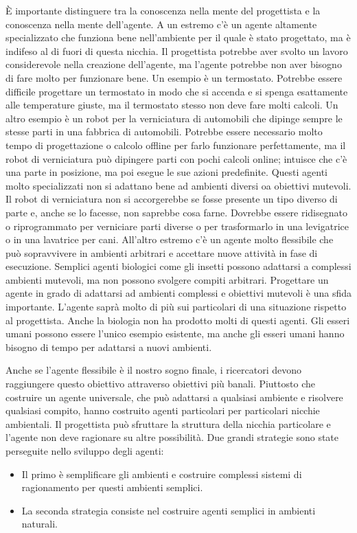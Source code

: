 \documentclass[a4paper]{extarticle}
\begin{document}
È importante distinguere tra la conoscenza nella mente del progettista e la conoscenza nella mente dell'agente. A un estremo c'è un agente altamente specializzato che funziona bene nell'ambiente per il quale è stato progettato, ma è indifeso al di fuori di questa nicchia. Il progettista potrebbe aver svolto un lavoro considerevole nella creazione dell'agente, ma l'agente potrebbe non aver bisogno di fare molto per funzionare bene. Un esempio è un termostato. Potrebbe essere difficile progettare un termostato in modo che si accenda e si spenga esattamente alle temperature giuste, ma il termostato stesso non deve fare molti calcoli. Un altro esempio è un robot per la verniciatura di automobili che dipinge sempre le stesse parti in una fabbrica di automobili. Potrebbe essere necessario molto tempo di progettazione o calcolo offline per farlo funzionare perfettamente, ma il robot di verniciatura può dipingere parti con pochi calcoli online; intuisce che c'è una parte in posizione, ma poi esegue le sue azioni predefinite. Questi agenti molto specializzati non si adattano bene ad ambienti diversi oa obiettivi mutevoli. Il robot di verniciatura non si accorgerebbe se fosse presente un tipo diverso di parte e, anche se lo facesse, non saprebbe cosa farne. Dovrebbe essere ridisegnato o riprogrammato per verniciare parti diverse o per trasformarlo in una levigatrice o in una lavatrice per cani. All'altro estremo c'è un agente molto flessibile che può sopravvivere in ambienti arbitrari e accettare nuove attività in fase di esecuzione. Semplici agenti biologici come gli insetti possono adattarsi a complessi ambienti mutevoli, ma non possono svolgere compiti arbitrari. Progettare un agente in grado di adattarsi ad ambienti complessi e obiettivi mutevoli è una sfida importante. L'agente saprà molto di più sui particolari di una situazione rispetto al progettista. Anche la biologia non ha prodotto molti di questi agenti. Gli esseri umani possono essere l'unico esempio esistente, ma anche gli esseri umani hanno bisogno di tempo per adattarsi a nuovi ambienti.

Anche se l'agente flessibile è il nostro sogno finale, i ricercatori devono raggiungere questo obiettivo attraverso obiettivi più banali. Piuttosto che costruire un agente universale, che può adattarsi a qualsiasi ambiente e risolvere qualsiasi compito, hanno costruito agenti particolari per particolari nicchie ambientali. Il progettista può sfruttare la struttura della nicchia particolare e l'agente non deve ragionare su altre possibilità. Due grandi strategie sono state perseguite nello sviluppo degli agenti:
\begin{itemize}
\item Il primo è semplificare gli ambienti e costruire complessi sistemi di ragionamento per questi ambienti semplici.
\item La seconda strategia consiste nel costruire agenti semplici in ambienti naturali.
\end{itemize}
\end{document}
